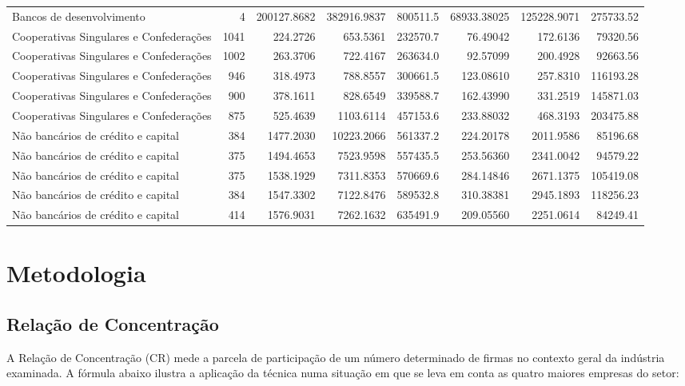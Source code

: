 \documentclass[
]{article}
\begin{document}
\begin{table}
{\begin{tabular}{lrrrrrrr}
Bancos
 de desenvolvimento & 4 & 200127.8682 & 382916.9837 & 800511.5 & 68933.38025 & 125228.9071 & 275733.52\\
\addlinespace
Cooperativas Singulares
 e Confederações & 1041 & 224.2726 & 653.5361 & 232570.7 & 76.49042 & 172.6136 & 79320.56\\
Cooperativas Singulares
 e Confederações & 1002 & 263.3706 & 722.4167 & 263634.0 & 92.57099 & 200.4928 & 92663.56\\
Cooperativas Singulares
 e Confederações & 946 & 318.4973 & 788.8557 & 300661.5 & 123.08610 & 257.8310 & 116193.28\\
Cooperativas Singulares
 e Confederações & 900 & 378.1611 & 828.6549 & 339588.7 & 162.43990 & 331.2519 & 145871.03\\
Cooperativas Singulares
 e Confederações & 875 & 525.4639 & 1103.6114 & 457153.6 & 233.88032 & 468.3193 & 203475.88\\
\addlinespace
Não bancários
 de crédito e capital & 384 & 1477.2030 & 10223.2066 & 561337.2 & 224.20178 & 2011.9586 & 85196.68\\
Não bancários
 de crédito e capital & 375 & 1494.4653 & 7523.9598 & 557435.5 & 253.56360 & 2341.0042 & 94579.22\\
Não bancários
 de crédito e capital & 375 & 1538.1929 & 7311.8353 & 570669.6 & 284.14846 & 2671.1375 & 105419.08\\
Não bancários
 de crédito e capital & 384 & 1547.3302 & 7122.8476 & 589532.8 & 310.38381 & 2945.1893 & 118256.23\\
Não bancários
 de crédito e capital & 414 & 1576.9031 & 7262.1632 & 635491.9 & 209.05560 & 2251.0614 & 84249.41\\
\bottomrule
\end{tabular}}
\end{table}

\hypertarget{metodologia}{%
\section{Metodologia}\label{metodologia}}

\hypertarget{relauxe7uxe3o-de-concentrauxe7uxe3o}{%
\subsection{Relação de
Concentração}\label{relauxe7uxe3o-de-concentrauxe7uxe3o}}

A Relação de Concentração (CR) mede a parcela de participação de um
número determinado de firmas no contexto geral da indústria examinada. A
fórmula abaixo ilustra a aplicação da técnica numa situação em que se
leva em conta as quatro maiores empresas do setor:
\end{document}
